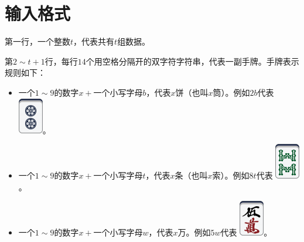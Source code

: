 \documentclass[
	lang=cn,
	color=green
]{elegantbook}
\begin{document}
\section*{输入格式}
第一行，一个整数$t$，代表共有$t$组数据。

第$2 \sim t+1$行，每行$14$个用空格分隔开的双字符字符串，代表一副手牌。手牌表示规则如下：

\begin{itemize}
	\item 一个$1 \sim 9$的数字$x+$一个小写字母$b$，代表$x$饼（也叫$x$筒）。例如$2b$代表 \includegraphics[scale=0.5]{images/mahjong/2p.png}。
	\item 一个$1 \sim 9$的数字$x+$一个小写字母$t$，代表$x$条（也叫$x$索）。例如$8t$代表 \includegraphics[scale=0.5]{images/mahjong/8s.png}。
	\item 一个$1 \sim 9$的数字$x+$一个小写字母$w$，代表$x$万。例如$5w$代表 \includegraphics[scale=0.5]{images/mahjong/5m.png}。

\end{itemize}
\end{document}
